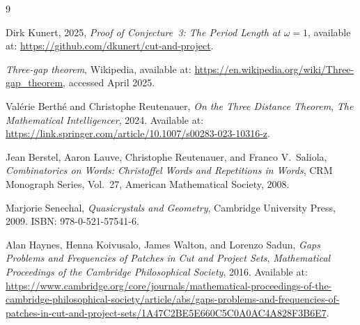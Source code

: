 \documentclass[11pt]{article}
\theoremstyle{plain}
\theoremstyle{remark}
\begin{document}
\begin{thebibliography}{9}

Dirk Kunert, 2025,
\emph{Proof of Conjecture~3: The Period Length at $\omega = 1$},
available at: \url{https://github.com/dkunert/cut-and-project}.

\emph{Three-gap theorem},
Wikipedia,
available at: \url{https://en.wikipedia.org/wiki/Three-gap_theorem},
accessed April 2025.

Val\'{e}rie Berth\'{e} and Christophe Reutenauer,
\emph{On the Three Distance Theorem},
\emph{The Mathematical Intelligencer}, 2024.
Available at: \url{https://link.springer.com/article/10.1007/s00283-023-10316-z}.

Jean Berstel, Aaron Lauve, Christophe Reutenauer, and Franco V.\ Saliola,
\emph{Combinatorics on Words: Christoffel Words and Repetitions in Words},
CRM Monograph Series, Vol.~27,
American Mathematical Society, 2008.

Marjorie Senechal,
\emph{Quasicrystals and Geometry},
Cambridge University Press, 2009.
ISBN: 978-0-521-57541-6.

Alan Haynes, Henna Koivusalo, James Walton, and Lorenzo Sadun,
\emph{Gaps Problems and Frequencies of Patches in Cut and Project Sets},
\emph{Mathematical Proceedings of the Cambridge Philosophical Society}, 2016.
Available at: \url{https://www.cambridge.org/core/journals/mathematical-proceedings-of-the-cambridge-philosophical-society/article/abs/gaps-problems-and-frequencies-of-patches-in-cut-and-project-sets/1A47C2BE5E660C5C0A0AC4A828F3B6E7}.

\end{thebibliography}
\end{document}
